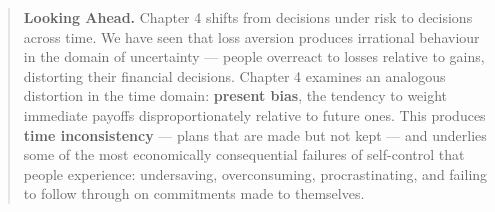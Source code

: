 \documentclass[12pt, letterpaper]{article}
\begin{document}
\medskip

\begin{quote}
\textbf{Looking Ahead.} Chapter 4 shifts from decisions under risk to decisions across time. We have seen that loss aversion produces irrational behaviour in the domain of uncertainty --- people overreact to losses relative to gains, distorting their financial decisions. Chapter 4 examines an analogous distortion in the time domain: \textbf{present bias}, the tendency to weight immediate payoffs disproportionately relative to future ones. This produces \textbf{time inconsistency} --- plans that are made but not kept --- and underlies some of the most economically consequential failures of self-control that people experience: undersaving, overconsuming, procrastinating, and failing to follow through on commitments made to themselves.
\end{quote}
\end{document}

